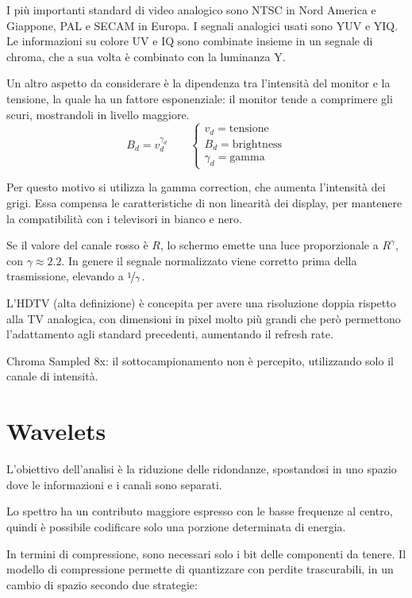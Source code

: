 I più importanti standard di video analogico sono NTSC in Nord America e Giappone, PAL e SECAM in Europa. I segnali analogici usati sono YUV e YIQ. Le informazioni su colore UV e IQ sono combinate insieme in un segnale di chroma, che a sua volta è combinato con la luminanza Y.

Un altro aspetto da considerare è la dipendenza tra l'intensità del monitor e la tensione, la quale ha un fattore esponenziale: il monitor tende a comprimere gli scuri, mostrandoli in livello maggiore.
$$B_d = v_d^{\gamma_d} \qquad \begin{cases}
v_d = \text{tensione} \\
B_d = \text{brightness} \\
\gamma_d = \text{gamma}
\end{cases}$$

Per questo motivo si utilizza la gamma correction, che aumenta l'intensità dei grigi. Essa compensa le caratteristiche di non linearità dei display, per mantenere la compatibilità con i televisori in bianco e nero.

Se il valore del canale rosso è $R$, lo schermo emette una luce proporzionale a $R^\gamma$, con $\gamma \approx 2.2$. In genere il segnale normalizzato viene corretto prima della trasmissione, elevando a $\nicefrac{1}{\gamma}$.

L'HDTV (alta definizione) è concepita per avere una risoluzione doppia rispetto alla TV analogica, con dimensioni in pixel molto più grandi che però permettono l'adattamento agli standard precedenti, aumentando il refresh rate.


Chroma Sampled 8x: il sottocampionamento non è percepito, utilizzando solo il canale di intensità.

\section{Wavelets}
L'obiettivo dell'analisi è la riduzione delle ridondanze, spostandosi in uno spazio dove le informazioni e i canali sono separati. 

Lo spettro ha un contributo maggiore espresso con le basse frequenze al centro, quindi è possibile codificare solo una porzione determinata di energia.

In termini di compressione, sono necessari solo i bit delle componenti da tenere. Il modello di compressione permette di quantizzare con perdite trascurabili, in un cambio di spazio secondo due strategie:

